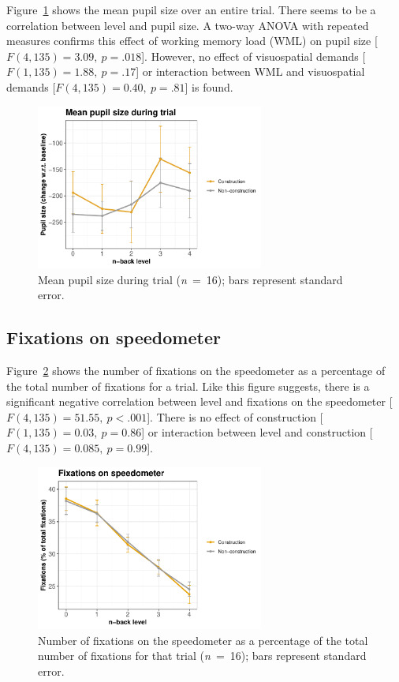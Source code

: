 Figure~\ref{fig:mean-ps} shows the mean pupil size over an entire trial. 
There seems to be a correlation between \nback level and pupil size.
A two-way ANOVA with repeated measures confirms this effect of working memory load (WML) on pupil size [\(F(4,135)=3.09,\ p=.018\)].
However, no effect of visuospatial demands [\(F(1,135)=1.88,\ p=.17\)] or interaction between WML and visuospatial demands [\(F(4,135)=0.40,\ p=.81\)] is found.

\begin{figure}
  \centering
  \includegraphics[width=7.5cm]{images/pupil_size_interaction.pdf}
  \caption{Mean pupil size during trial (\textit{n}\ =\ 16); bars represent standard error.}
  \label{fig:mean-ps}
\end{figure}

\subsection{Fixations on speedometer}
Figure~\ref{fig:fix-speedometer} shows the number of fixations on the speedometer as a percentage of the total number of fixations for a trial.
Like this figure suggests, there is a significant negative correlation between \nback level and fixations on the speedometer [\(F(4,135)=51.55,\ p<.001\)].
There is no effect of construction [\(F(1,135)=0.03,\ p=0.86\)] or interaction between \nback level and construction [\(F(4,135)=0.085,\ p=0.99\)]. 

\begin{figure}
  \centering
  \includegraphics[width=7.5cm]{images/speedometer_interaction.pdf}
  \caption{Number of fixations on the speedometer as a percentage of the total number of fixations for that trial (\textit{n}\ =\ 16); bars represent standard error.}
  \label{fig:fix-speedometer}
\end{figure}